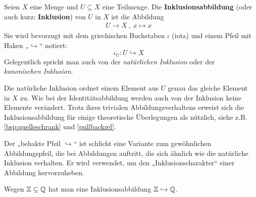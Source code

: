 \begin{defin}[Inklusionsabbildung] \label{def:inklusion} 
    Seien $X$ eine Menge und $U\subseteq X$ eine Teilmenge. Die \textbf{Inklusionsabbildung} (oder auch kurz: \textbf{Inklusion}) von $U$ in $X$ ist die Abbildung
    \begin{align*}
        U \to X \ ,\ x \mapsto x
    \end{align*}
    Sie wird bevorzugt mit dem griechischen Buchstaben $\iota$ (iota) und einem Pfeil mit Haken „$\hookrightarrow$“ notiert:
        \[ \iota_U : U \hookrightarrow X \]
    Gelegentlich spricht man auch von der \emph{natürlichen Inklusion} oder der \emph{kanonischen Inklusion}.
\end{defin}


\begin{bem}
    Die natürliche Inklusion ordnet einem Element aus $U$ genau das gleiche Element in $X$ zu. Wie bei der Identitätsabbildung werden auch von der Inklusion keine Elemente verändert. Trotz ihres trivialen Abbildungsverhaltens erweist sich die Inklusionsabbildung für einige theoretische Überlegungen als nützlich, siehe z.B. \cref{bsp:quelleschrank} und \cref{pullbackrel}.
    
    Der „behakte Pfeil $\hookrightarrow$“ ist schlicht eine Variante zum gewöhnlichen Abbildungspfeil, die bei Abbildungen auftritt, die sich ähnlich wie die natürliche Inklusion verhalten. Er wird verwendet, um den „Inklusionscharakter“ einer Abbildung hervorzuheben.
\end{bem}


\begin{bsp}
    Wegen $\mathbb Z\subseteq\mathbb Q$ hat man eine Inklusionsabbildung $\mathbb Z \hookrightarrow \mathbb Q$.%
\end{bsp}

